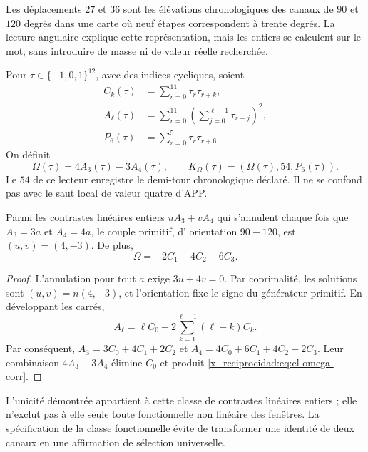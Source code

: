 Les déplacements \(27\) et \(36\) sont les élévations
chronologiques des canaux de \(90\) et \(120\) degrés dans une carte
où neuf étapes correspondent à trente degrés. La lecture angulaire
explique cette représentation, mais les entiers se calculent sur le
mot, sans introduire de masse ni de valeur réelle recherchée.

\begin{definition}
Pour \(\tau\in\{-1,0,1\}^{12}\), avec des indices cycliques, soient
\begin{align*}
 C_k(\tau)&=\sum_{r=0}^{11}\tau_r\tau_{r+k},\\
 A_\ell(\tau)&=\sum_{r=0}^{11}
           \left(\sum_{j=0}^{\ell-1}\tau_{r+j}\right)^2,\\
 P_6(\tau)&=\sum_{r=0}^{5}\tau_r\tau_{r+6}.
\end{align*}
On définit
\begin{equation}
 \Omega(\tau)=4A_3(\tau)-3A_4(\tau),\qquad
 K_\Omega(\tau)=(\Omega(\tau),54,P_6(\tau)).
 \label{x_reciprocidad:eq:el-komega}
\end{equation}
Le \(54\) de ce lecteur enregistre le demi-tour chronologique déclaré.
Il ne se confond pas avec le saut local de valeur quatre d'APP.
\end{definition}

\begin{lemma}
Parmi les contrastes linéaires entiers \(uA_3+vA_4\) qui s'annulent
chaque fois que \(A_3=3a\) et \(A_4=4a\), le couple primitif, d'
orientation \(90-120\), est \((u,v)=(4,-3)\). De plus,
\begin{equation}
 \Omega=-2C_1-4C_2-6C_3.
 \label{x_reciprocidad:eq:el-omega-corr}
\end{equation}
\end{lemma}
\begin{proof}
L'annulation pour tout \(a\) exige \(3u+4v=0\). Par coprimalité, les solutions sont \((u,v)=n(4,-3)\), et l'orientation fixe le signe du générateur primitif. En développant les carrés,
\[
 A_\ell=\ell C_0+2\sum_{k=1}^{\ell-1}(\ell-k)C_k.
\]
Par conséquent,
\(A_3=3C_0+4C_1+2C_2\) et
\(A_4=4C_0+6C_1+4C_2+2C_3\). Leur combinaison \(4A_3-3A_4\)
élimine \(C_0\) et produit \eqref{x_reciprocidad:eq:el-omega-corr}.
\end{proof}

L'unicité démontrée appartient à cette classe de contrastes linéaires
entiers ; elle n'exclut pas à elle seule toute fonctionnelle non linéaire des fenêtres.
La spécification de la classe fonctionnelle évite de transformer une identité
de deux canaux en une affirmation de sélection universelle.

